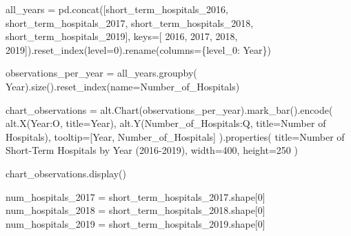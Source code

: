 \documentclass[
  letterpaper,
  DIV=11,
  numbers=noendperiod]{scrartcl}
\newenvironment{Shaded}{\begin{snugshade}}{\end{snugshade}}
\newcommand{\DecValTok}[1]{\textcolor[rgb]{0.68,0.00,0.00}{#1}}
\newcommand{\NormalTok}[1]{\textcolor[rgb]{0.00,0.23,0.31}{#1}}
\newcommand{\OperatorTok}[1]{\textcolor[rgb]{0.37,0.37,0.37}{#1}}
\newcommand{\StringTok}[1]{\textcolor[rgb]{0.13,0.47,0.30}{#1}}
\begin{document}
\begin{Shaded}
\begin{Highlighting}[]
\NormalTok{all\_years }\OperatorTok{=}\NormalTok{ pd.concat([short\_term\_hospitals\_2016, short\_term\_hospitals\_2017, short\_term\_hospitals\_2018, short\_term\_hospitals\_2019], keys}\OperatorTok{=}\NormalTok{[}
                      \StringTok{\textquotesingle{}2016\textquotesingle{}}\NormalTok{, }\StringTok{\textquotesingle{}2017\textquotesingle{}}\NormalTok{, }\StringTok{\textquotesingle{}2018\textquotesingle{}}\NormalTok{, }\StringTok{\textquotesingle{}2019\textquotesingle{}}\NormalTok{]).reset\_index(level}\OperatorTok{=}\DecValTok{0}\NormalTok{).rename(columns}\OperatorTok{=}\NormalTok{\{}\StringTok{\textquotesingle{}level\_0\textquotesingle{}}\NormalTok{: }\StringTok{\textquotesingle{}Year\textquotesingle{}}\NormalTok{\})}

\NormalTok{observations\_per\_year }\OperatorTok{=}\NormalTok{ all\_years.groupby(}
    \StringTok{\textquotesingle{}Year\textquotesingle{}}\NormalTok{).size().reset\_index(name}\OperatorTok{=}\StringTok{\textquotesingle{}Number\_of\_Hospitals\textquotesingle{}}\NormalTok{)}

\NormalTok{chart\_observations }\OperatorTok{=}\NormalTok{ alt.Chart(observations\_per\_year).mark\_bar().encode(}
\NormalTok{    alt.X(}\StringTok{\textquotesingle{}Year:O\textquotesingle{}}\NormalTok{, title}\OperatorTok{=}\StringTok{\textquotesingle{}Year\textquotesingle{}}\NormalTok{),}
\NormalTok{    alt.Y(}\StringTok{\textquotesingle{}Number\_of\_Hospitals:Q\textquotesingle{}}\NormalTok{, title}\OperatorTok{=}\StringTok{\textquotesingle{}Number of Hospitals\textquotesingle{}}\NormalTok{),}
\NormalTok{    tooltip}\OperatorTok{=}\NormalTok{[}\StringTok{\textquotesingle{}Year\textquotesingle{}}\NormalTok{, }\StringTok{\textquotesingle{}Number\_of\_Hospitals\textquotesingle{}}\NormalTok{]}
\NormalTok{).properties(}
\NormalTok{    title}\OperatorTok{=}\StringTok{\textquotesingle{}Number of Short{-}Term Hospitals by Year (2016{-}2019)\textquotesingle{}}\NormalTok{,}
\NormalTok{    width}\OperatorTok{=}\DecValTok{400}\NormalTok{,}
\NormalTok{    height}\OperatorTok{=}\DecValTok{250}
\NormalTok{)}

\NormalTok{chart\_observations.display()}

\NormalTok{num\_hospitals\_2017 }\OperatorTok{=}\NormalTok{ short\_term\_hospitals\_2017.shape[}\DecValTok{0}\NormalTok{]}
\NormalTok{num\_hospitals\_2018 }\OperatorTok{=}\NormalTok{ short\_term\_hospitals\_2018.shape[}\DecValTok{0}\NormalTok{]}
\NormalTok{num\_hospitals\_2019 }\OperatorTok{=}\NormalTok{ short\_term\_hospitals\_2019.shape[}\DecValTok{0}\NormalTok{]}


\end{Highlighting}
\end{Shaded}
\end{document}

